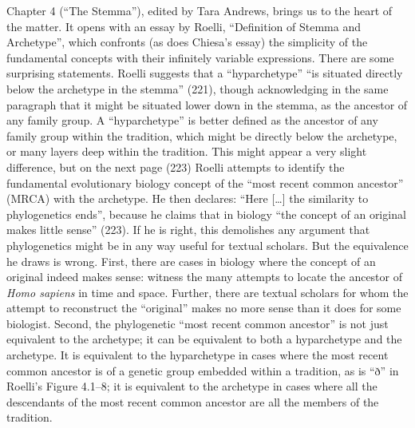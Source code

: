\documentclass{article}
\begin{document}
Chapter 4 (``The Stemma''), edited by Tara Andrews, brings us
to the heart of the matter. It opens with an essay by Roelli,
``Definition of Stemma and Archetype'', which confronts (as does
Chiesa's essay) the simplicity of the fundamental concepts with their
infinitely variable expressions. There are some surprising statements.
Roelli suggests that a ``hyparchetype'' ``is situated directly below the
archetype in the stemma'' (221), though acknowledging in the same
paragraph that it might be situated lower down in the stemma, as the
ancestor of any family group. A ``hyparchetype'' is better defined as
the ancestor of any family group within the tradition, which might be
directly below the archetype, or many layers deep within the tradition.
This might appear a very slight difference, but on the next page (223)
Roelli attempts to identify the fundamental evolutionary biology concept
of the ``most recent common ancestor'' (MRCA) with the archetype. He
then declares: ``Here [\ldots] the similarity to phylogenetics
ends'', because he claims that in biology ``the concept of an original
makes little sense'' (223). If he is right, this demolishes any argument
that phylogenetics might be in any way useful for textual scholars. But
the equivalence he draws is wrong. First, there are cases in biology
where the concept of an original indeed makes sense: witness the many
attempts to locate the ancestor of \emph{Homo sapiens} in time and
space. Further, there are textual scholars for whom the attempt to
reconstruct the ``original'' makes no more sense than it does for some
biologist. Second, the phylogenetic ``most recent common ancestor'' is
not just equivalent to the archetype; it can be equivalent to both a
hyparchetype and the archetype. It is equivalent to the hyparchetype in
cases where the most recent common ancestor is of a genetic group
embedded within a tradition, as is ``ð'' in Roelli's Figure 4.1--8; it is
equivalent to the archetype in cases where all the descendants of the
most recent common ancestor are all the members of the tradition.
\end{document}
